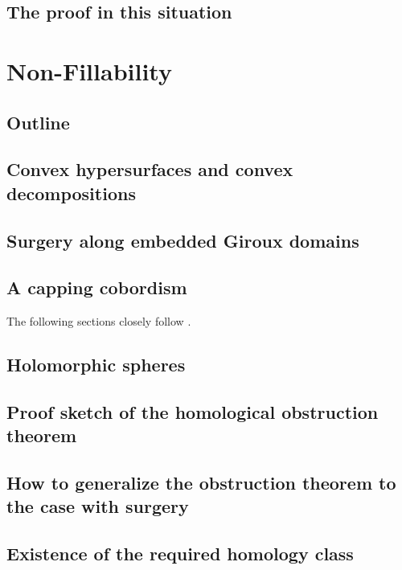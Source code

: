 \documentclass[oneside]{amsbook}
\begin{document}
\section{The proof in this situation}



\chapter{Non-Fillability}
\section{Outline}
\section{Convex hypersurfaces and convex decompositions}

\section{Surgery along embedded Giroux domains}

\section{A capping cobordism}
The following sections closely follow \cite[Section 6]{BGM22}.

\section{Holomorphic spheres}

\section{Proof sketch of the homological obstruction theorem}

\section{How to generalize the obstruction theorem to the case with surgery}
\section{Existence of the required homology class}

\newpage


\end{document}
